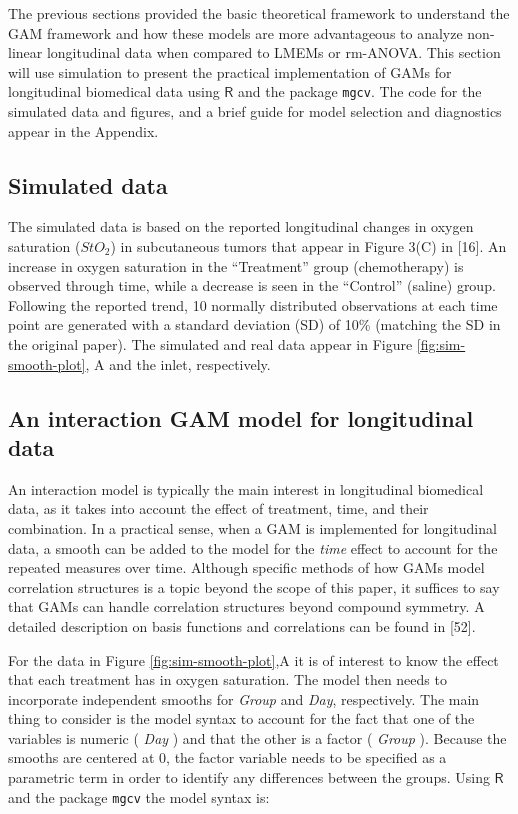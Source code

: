 \documentclass[
]{article}
\begin{document}
The previous sections provided the basic theoretical framework to understand the GAM framework and how these models are more advantageous to analyze non-linear longitudinal data when compared to LMEMs or rm-ANOVA. This section will use simulation to present the practical implementation of GAMs for longitudinal biomedical data using \(\textsf{R}\) and the package \texttt{mgcv}. The code for the simulated data and figures, and a brief guide for model selection and diagnostics appear in the Appendix.

\hypertarget{simulated-data}{%
\subsection{Simulated data}\label{simulated-data}}

The simulated data is based on the reported longitudinal changes in oxygen saturation (\(StO_2\)) in subcutaneous tumors that appear in Figure 3(C) in {[}16{]}. An increase in oxygen saturation in the ``Treatment'' group (chemotherapy) is observed through time, while a decrease is seen in the ``Control'' (saline) group. Following the reported trend, 10 normally distributed observations at each time point are generated with a standard deviation (SD) of 10\% (matching the SD in the original paper).
The simulated and real data appear in Figure \ref{fig:sim-smooth-plot}, A and the inlet, respectively.

\hypertarget{an-interaction-gam-model-for-longitudinal-data}{%
\subsection{An interaction GAM model for longitudinal data}\label{an-interaction-gam-model-for-longitudinal-data}}

An interaction model is typically the main interest in longitudinal biomedical data, as it takes into account the effect of treatment, time, and their combination. In a practical sense, when a GAM is implemented for longitudinal data, a smooth can be added to the model for the \emph{time} effect to account for the repeated measures over time. Although specific methods of how GAMs model correlation structures is a topic beyond the scope of this paper, it suffices to say that GAMs can handle correlation structures beyond compound symmetry. A detailed description on basis functions and correlations can be found in {[}52{]}.

For the data in Figure \ref{fig:sim-smooth-plot},A it is of interest to know the effect that each treatment has in oxygen saturation. The model then needs to incorporate independent smooths for \emph{Group} and \emph{Day}, respectively. The main thing to consider is the model syntax to account for the fact that one of the variables is numeric ( \emph{Day} ) and that the other is a factor ( \emph{Group} ). Because the smooths are centered at 0, the factor variable needs to be specified as a parametric term in order to identify any differences between the groups. Using \(\textsf{R}\) and the package \texttt{mgcv} the model syntax is:
\end{document}
